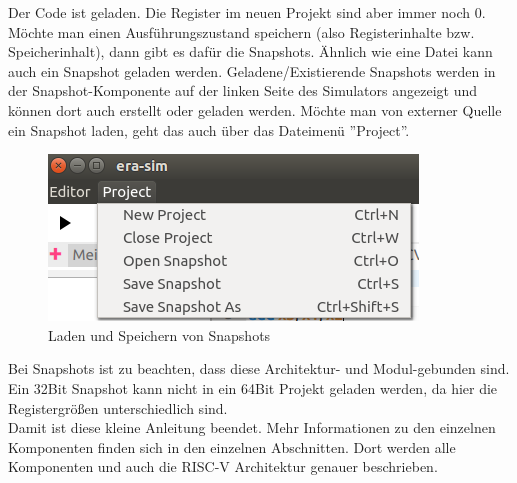 Der Code ist geladen. Die Register im neuen Projekt sind aber immer noch 0. Möchte man einen Ausführungszustand speichern (also Registerinhalte bzw. Speicherinhalt), dann gibt es dafür die Snapshots. Ähnlich wie eine Datei kann auch ein Snapshot geladen werden. Geladene/Existierende Snapshots werden in der Snapshot-Komponente auf der linken Seite des Simulators angezeigt und können dort auch erstellt oder geladen werden. Möchte man von externer Quelle ein Snapshot laden, geht das auch über das Dateimenü ''Project''.
\begin{figure}[H]
	\centering
	\includegraphics[scale=1.0]{Images/first-steps-13.png}
	\caption{Laden und Speichern von Snapshots}
\end{figure}

Bei Snapshots ist zu beachten, dass diese Architektur- und Modul-gebunden sind. Ein 32Bit Snapshot kann nicht in ein 64Bit Projekt geladen werden, da hier die Registergrößen unterschiedlich sind.\\

Damit ist diese kleine Anleitung beendet. Mehr Informationen zu den einzelnen Komponenten finden sich in den einzelnen Abschnitten. Dort werden alle Komponenten und auch die RISC-V Architektur genauer beschrieben.